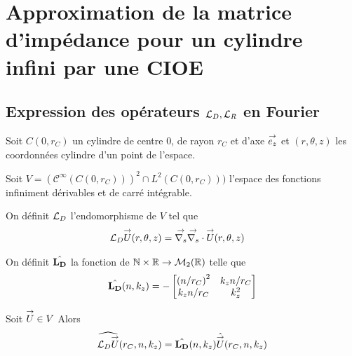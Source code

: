 \section{Approximation de la matrice d'impédance pour un cylindre infini par une CIOE}

  \subsection[Expression des opérateurs LD,LR en Fourier]{Expression des opérateurs \({\mathcal{L}_D},{\mathcal{L}_R}\) en Fourier}
    Soit \(C(0,r_C)\) un cylindre de centre 0, de rayon \(r_C\) et d'axe \({\overset{\rightarrow}{e_z}}\) et \((r,\theta,z)\) les coordonnées cylindre d'un point de l'espace.

    Soit \(V = \left(\mathcal{C}^\infty(C(0,r_C))\right)^2 \cap L^2(C(0,r_C)))\) l'espace des fonctions infiniment dérivables et de carré intégrable.

    \begin{defn}
      \label{eq:cylindre:fourier:LD}
      On définit \({\mathcal{L}_D}\) l'endomorphisme de \(V\) tel que
      \begin{align*}
        {\mathcal{L}_D} {\overset{\rightarrow}{U}}(r,\theta,z) & = {\overset{\rightarrow}{\nabla_s}}{} {\overset{\rightarrow}{\nabla_s}} \cdot{} {\overset{\rightarrow}{U}}(r,\theta,z)
      \end{align*}

      On définit \(\hat{\mathbf{L_D}}\) la fonction de \(\mathbb N\times\mathbb R \rightarrow \mathcal{M}_2(\mathbb R)\) telle que
      \begin{equation*}
        \hat{\mathbf{L_D}}(n,k_z) = -
        \begin{bmatrix}
          \left({n}\slash{r_C}\right)^2 & k_z{n}\slash{r_C}
          \\
          k_z{n}\slash{r_C} & k_z^2
        \end{bmatrix}
      \end{equation*}
    \end{defn}

    \begin{prop}
      Soit \({\overset{\rightarrow}{U}} \in V\)
      Alors
      \begin{equation*}
        \widehat{{\mathcal{L}_D} {\overset{\rightarrow}{U}}} (r_C,n,k_z) = \hat{\mathbf{L_D}}(n,k_z) \hat{{\overset{\rightarrow}{U}}}(r_C,n,k_z)
      \end{equation*}
    \end{prop}

